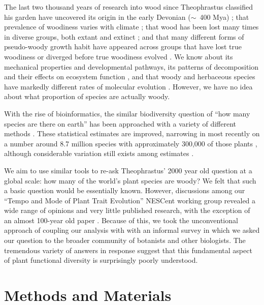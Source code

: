 \documentclass[12pt]{article}
\begin{document}
The last two thousand years of research into wood since Theophrastus
classified his garden have uncovered its origin in the early Devonian
($\sim$~400 Mya) \citep{gerrienne2011simple}; that prevalence of
woodiness varies with climate \citep{Molesheihgt}; that wood has been
lost many times in diverse groups, both extant and extinct
\citep{judd1994}; and that many different forms of pseudo-woody growth
habit have appeared across groups that have lost true woodiness or
diverged before true woodiness evolved \citep{Cornwellwood}.  We know
about its mechanical properties and developmental pathways, its
patterns of decomposition and their effects on ecosystem function
\citep{Cornwellwood}, and that woody and herbaceous species have
markedly different rates of molecular evolution \citep{SmithDonoghue}.
%
However, we have no idea about what proportion of species are actually
woody.

With the rise of bioinformatics, the similar biodiversity question of
``how many species are there on earth'' has been approached with a
variety of different methods \citep{may1988many,erwin1991many,
  stork1993many, joppa2010, costello2011, mora2011plos}.  These
statistical estimates are improved, narrowing in most recently on a
number around 8.7 million species with approximately 300,000 of those
plants \citep{mora2011plos}, although considerable variation still
exists among estimates \citep{costello2011}.

We aim to use similar tools to re-ask Theophrastus' 2000 year old
question at a global scale: how many of the world's plant species are
woody?
We felt that such a basic question would be essentially known.
%
However, discussions among our ``Tempo and Mode of Plant Trait
Evolution'' NESCent working group revealed a wide range of opinions
and very little published research, with the exception of an almost
100-year old paper \citep{sinnott1915evolution}.
%
Because of this, we took the unconventional approach of coupling our
analysis with with an informal survey in which we asked our question
to the broader community of botanists and other biologists.
% 
The tremendous variety of answers in response suggest that this
fundamental aspect of plant functional diversity is surprisingly
poorly understood.

\section{Methods and Materials}
\end{document}
